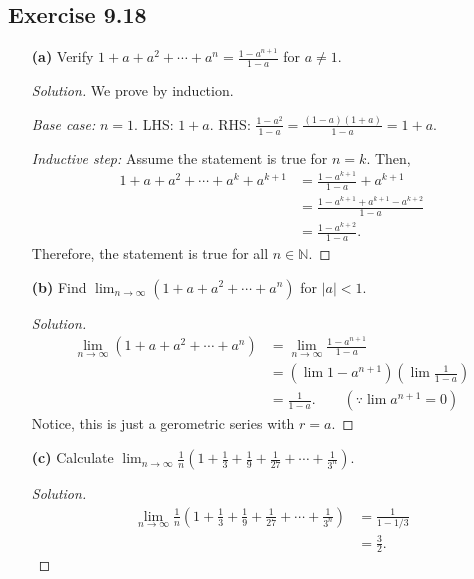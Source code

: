 \documentclass{article}
\begin{document}
\subsection*{Exercise 9.18}
\begin{enumerate}
    \item[\textbf{(a)}]
    Verify $1+a+a^2+\cdots+a^n=\frac{1-a^{n+1}}{1-a}$ for $a\neq 1$.
    \begin{proof}[Solution]
        We prove by induction. 

        \emph{Base case:} $n=1$. LHS: $1+a$. RHS: $\frac{1-a^2}{1-a}=\frac{(1-a)(1+a)}{1-a}=1+a$.

        \emph{Inductive step:} Assume the statement is true for $n=k$. Then,
        \begin{align*}
            1+a+a^2+\cdots+a^k+a^{k+1} & = \frac{1-a^{k+1}}{1-a}+a^{k+1} \\
            & = \frac{1-a^{k+1}+a^{k+1}-a^{k+2}}{1-a} \\
            & = \frac{1-a^{k+2}}{1-a}.
        \end{align*}
        Therefore, the statement is true for all $n\in\mathbb{N}$.
    \end{proof}

    \newpage
    \item[\textbf{(b)}]
    Find $\lim_{n\to\infty}(1+a+a^2+\cdots+a^n)$ for $|a|<1$.
    \begin{proof}[Solution]
        \begin{align*}
            \lim_{n\to\infty}(1+a+a^2+\cdots+a^n) & = \lim_{n\to\infty}\frac{1-a^{n+1}}{1-a} \\
            & = \left(\lim 1-a^{n+1}\right) \left(\lim \frac{1}{1-a}\right) \\
            & = \frac{1}{1-a}. \qquad (\because\lim a^{n+1}=0)
        \end{align*}
        Notice, this is just a gerometric series with $r=a$. 
    \end{proof}

    \item[\textbf{(c)}]
    Calculate $\lim_{n\to\infty}\frac{1}{n}\left(1+\frac{1}{3}+\frac{1}{9}+\frac{1}{27}
    +\cdots+\frac{1}{3^n}\right)$.
    \begin{proof}[Solution]
        \begin{align*}
            \lim_{n\to\infty}\frac{1}{n}\left(1+\frac{1}{3}+\frac{1}{9}+\frac{1}{27}
            +\cdots+\frac{1}{3^n}\right) & = \frac{1}{1-1/3} \\
            & = \frac{3}{2}.
        \end{align*}
    \end{proof}


\end{enumerate}
\end{document}
